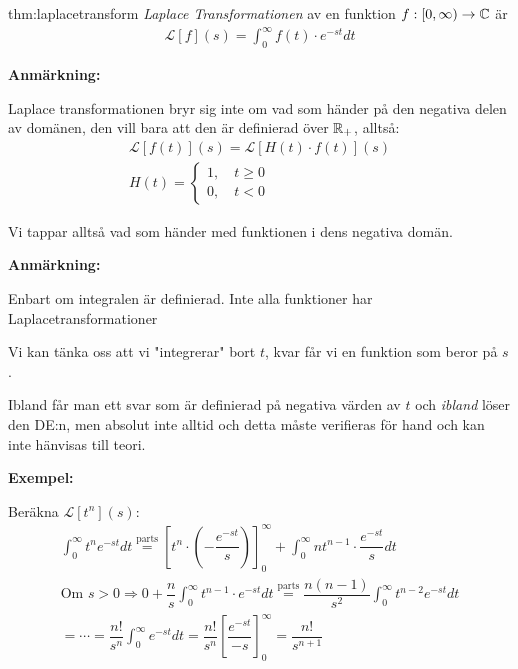 \begin{theo}{thm:laplacetransform}
  \textit{Laplace Transformationen} av en funktion $f:[0,\infty)\to\mathbb{C}$ är
  \begin{equation*}
    \begin{gathered}
      \mathcal{L}[f](s) = \int_{0}^{\infty}f(t)\cdot e^{-st}dt
    \end{gathered}
  \end{equation*}
  \par\bigskip
  \noindent\textbf{Anmärkning:}\par
  \noindent Laplace transformationen bryr sig inte om vad som händer på den negativa delen av domänen, den vill bara att den är definierad över $\mathbb{R}_+$, alltså:
  \begin{equation*}
    \begin{gathered}
      \mathcal{L}[f(t)](s) = \mathcal{L}[H(t)\cdot f(t)](s)\\
      H(t) = 
      \begin{cases*}
        1,\quad t\geq0\\
        0,\quad t<0
      \end{cases*}
    \end{gathered}
  \end{equation*}\par
  \noindent Vi tappar alltså vad som händer med funktionen i dens negativa domän.
  \par\bigskip
  \noindent\textbf{Anmärkning:}\par
  \noindent Enbart om integralen är definierad. Inte alla funktioner har Laplacetransformationer
  \par\bigskip
  \noindent Vi kan tänka oss att vi "integrerar" bort $t$, kvar får vi en funktion som beror på $s$.
\end{theo}
\par\bigskip
\noindent Ibland får man ett svar som är definierad på negativa värden av $t$ och \textit{ibland} löser den DE:n, men absolut inte alltid och detta måste verifieras för hand och kan inte hänvisas till teori.
\par\bigskip
\noindent\textbf{Exempel:}\par
\noindent Beräkna $\mathcal{L}[t^n](s)$:
\begin{equation*}
  \begin{gathered}
    \int_{0}^{\infty}t^ne^{-st}dt\stackrel{\text{parts}}{=} \left[t^n\cdot(-\dfrac{e^{-st}}{s})\right]_0^\infty+\int_{0}^{\infty}nt^{n-1}\cdot\dfrac{e^{-st}}{s}dt\\
    \text{Om } s>0\Rightarrow 0+\dfrac{n}{s}\int_{0}^{\infty}t^{n-1}\cdot e^{-st}dt\stackrel{\text{parts}}{=}\dfrac{n(n-1)}{s^2}\int_{0}^{\infty}t^{n-2}e^{-st}dt\\
    =\cdots=\dfrac{n!}{s^n}\int_{0}^{\infty}e^{-st}dt = \dfrac{n!}{s^n}\left[\dfrac{e^{-st}}{-s}\right]_0^\infty = \dfrac{n!}{s^{n+1}}
  \end{gathered}
\end{equation*}
